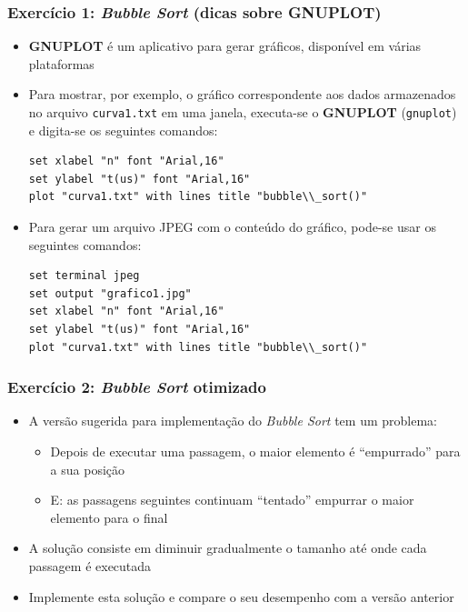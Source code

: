 \documentclass[aspectratio=169]{beamer}
\begin{document}
\begin{frame}[fragile]\frametitle{Exercício 1: \emph{Bubble Sort} (dicas sobre \textbf{GNUPLOT})}
\begin{itemize}
	\item \textbf{GNUPLOT} é um aplicativo para gerar gráficos, disponível em várias plataformas
	\item Para mostrar, por exemplo, o gráfico correspondente aos dados armazenados no arquivo \texttt{curva1.txt} em uma janela, executa-se o \textbf{GNUPLOT} (\texttt{gnuplot}) e digita-se os seguintes comandos:
{\scriptsize
\begin{verbatim}
set xlabel "n" font "Arial,16"
set ylabel "t(us)" font "Arial,16"
plot "curva1.txt" with lines title "bubble\\_sort()"
\end{verbatim}
}
	\item Para gerar um arquivo JPEG com o conteúdo do gráfico, pode-se usar os seguintes comandos:
{\scriptsize
\begin{verbatim}
set terminal jpeg
set output "grafico1.jpg"
set xlabel "n" font "Arial,16"
set ylabel "t(us)" font "Arial,16"
plot "curva1.txt" with lines title "bubble\\_sort()"
\end{verbatim}
}
\end{itemize}
\end{frame}

\begin{frame}[fragile]\frametitle{Exercício 2: \emph{Bubble Sort} otimizado}
\begin{itemize}
	\item A versão sugerida para implementação do \emph{Bubble Sort} tem um problema:
	\begin{itemize}
		\item Depois de executar uma passagem, o maior elemento é ``empurrado'' para a sua posição
		\item E: as passagens seguintes continuam ``tentado'' empurrar o maior elemento para o final
	\end{itemize}
	\item A solução consiste em diminuir gradualmente o tamanho até onde cada passagem é executada
	\item Implemente esta solução e compare o seu desempenho com a versão anterior
\end{itemize}
\end{frame}
\end{document}
